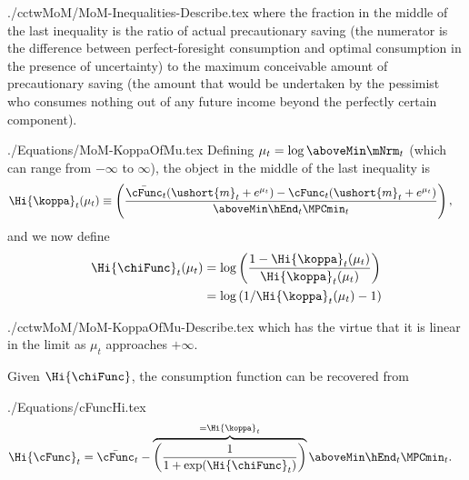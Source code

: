 \documentclass[titlepage, headings=optiontotocandhead]{\econtex}
\begin{document}
\unskip
\begin{verbatimwrite}{./cctwMoM/MoM-Inequalities-Describe.tex}
  where the fraction in the middle of the last inequality is the ratio
  of actual precautionary saving (the numerator is the difference
  between perfect-foresight consumption and optimal consumption in the
  presence of uncertainty) to the maximum conceivable amount of
  precautionary saving (the amount that would be undertaken by the
  pessimist who consumes nothing out of any future income beyond the perfectly certain component).
\end{verbatimwrite}
\unskip

\begin{verbatimwrite}{./Equations/MoM-KoppaOfMu.tex}
  Defining $\mu_{t} =
  \log \aboveMin \mNrm_{t}$ (which can range from $-\infty$ to $\infty$), the object in the middle of the last inequality is
  \begin{equation}\begin{gathered}\begin{aligned}
        \Hi{\koppa}_{t}(\mu_{t})   & \equiv  \left(\frac{\bar{\cFunc}_{t}(\ushort{m}_{t}+e^{\mu_{t}})-\cFunc_{t}(\ushort{m}_{t}+e^{\mu_{t}})}{\aboveMin \hEnd_{t} \MPCmin_{t}}\right), \label{eq:koppa}
      \end{aligned}\end{gathered}\end{equation}
  and we now define
  \begin{equation}\begin{gathered}\begin{aligned}
        \Hi{\chiFunc}_{t}(\mu_{t})  & = \log \left(\frac{1-\Hi{\koppa}_{t}(\mu_{t})}{\Hi{\koppa}_{t}(\mu_{t})}\right)
        \\  & = \log \left(1/\Hi{\koppa}_{t}(\mu_{t})-1\right) \label{eq:chi}
      \end{aligned}\end{gathered}\end{equation}
\end{verbatimwrite}
\unskip
\begin{verbatimwrite}{./cctwMoM/MoM-KoppaOfMu-Describe.tex}
  which has the virtue that it is linear in the limit as $\mu_{t}$ approaches $+\infty$.

  Given $\Hi{\chiFunc}$, the consumption function can be recovered from
\end{verbatimwrite}
\unskip
\begin{verbatimwrite}{./Equations/cFuncHi.tex}
  \begin{equation}\begin{gathered}\begin{aligned}
        \Hi{\cFunc}_{t}  & = \bar{\cFunc}_{t}-\overbrace{\left(\frac{1}{1+\exp(\Hi{\chiFunc}_{t})}\right)}^{=\Hi{\koppa}_{t}} \aboveMin \hEnd_{t} \MPCmin_{t}. \label{eq:cFuncHi}
      \end{aligned}\end{gathered}\end{equation}
\end{verbatimwrite}
\unskip
\end{document}
